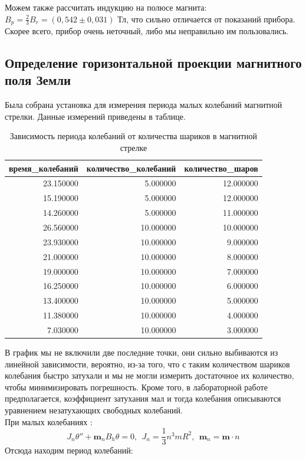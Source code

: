 \documentclass[a4paper, 12pt]{article}
\begin{document}
	Можем также рассчитать индукцию на полюсе магнита: $B_p = \frac{2}{3}B_r = (0,542 \pm 0,031)$ Тл, что сильно отличается от показаний прибора. Скорее всего, прибор очень неточный, либо мы неправильно им пользовались.
	
	\subsection*{Определение горизонтальной проекции магнитного поля Земли}
 	
	Была собрана установка для измерения периода малых колебаний магнитной стрелки. Данные измерений приведены в таблице.
	
	
	\begin{table}[h]
		\centering
		\begin{tabular}{|r|r|r|}
            \toprule
            время_колебаний & количество_колебаний & количество_шаров \\
            \midrule
            23.150000 & 5.000000 & 12.000000 \\
            15.190000 & 5.000000 & 12.000000 \\
            14.260000 & 5.000000 & 11.000000 \\
            26.560000 & 10.000000 & 10.000000 \\
            23.930000 & 10.000000 & 9.000000 \\
            21.000000 & 10.000000 & 8.000000 \\
            19.000000 & 10.000000 & 7.000000 \\
            16.250000 & 10.000000 & 6.000000 \\
            13.400000 & 10.000000 & 5.000000 \\
            11.380000 & 10.000000 & 4.000000 \\
            7.030000 & 10.000000 & 3.000000 \\
            \bottomrule
            \end{tabular}
		\caption{Зависимость периода колебаний от количества шариков в магнитной стрелке}
	\end{table}
	
	В график мы не включили две последние точки, они сильно выбиваются из линейной зависимости, вероятно, из-за того, что с таким количеством шариков колебания быстро затухали и мы не могли измерить достаточное их количество, чтобы минимизировать погрешность. Кроме того, в лабораторной работе предполагается, коэффициент затухания мал и тогда колебания описываются уравнением незатухающих свободных колебаний.\\
	При малых колебаниях : 
	\[J_n\theta'' + \mathbf{m}_nB_h \theta = 0, \ \ J_n = \frac{1}{3}n^3mR^2, \ \ \mathbf{m}_n = \mathbf{m} \cdot n  \]
	Отсюда находим период колебаний: 
	
\end{document}
